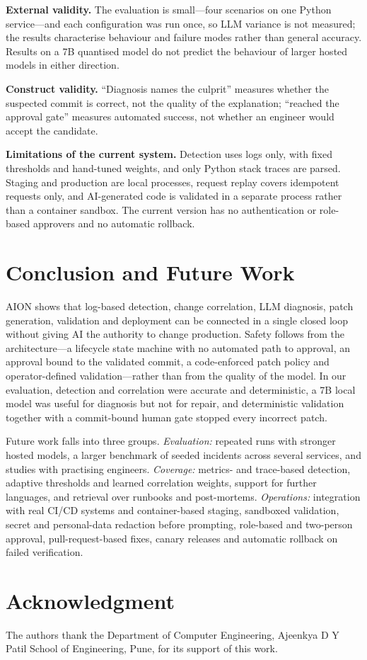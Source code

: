 \documentclass[conference]{IEEEtran}
\begin{document}
\textbf{External validity.} The evaluation is small---four scenarios on one Python service---and each configuration was run once, so LLM variance is not measured; the results characterise behaviour and failure modes rather than general accuracy. Results on a 7B quantised model do not predict the behaviour of larger hosted models in either direction.

\textbf{Construct validity.} ``Diagnosis names the culprit'' measures whether the suspected commit is correct, not the quality of the explanation; ``reached the approval gate'' measures automated success, not whether an engineer would accept the candidate.

\textbf{Limitations of the current system.} Detection uses logs only, with fixed thresholds and hand-tuned weights, and only Python stack traces are parsed. Staging and production are local processes, request replay covers idempotent requests only, and AI-generated code is validated in a separate process rather than a container sandbox. The current version has no authentication or role-based approvers and no automatic rollback.

\section{Conclusion and Future Work}
\label{sec:concl}
AION shows that log-based detection, change correlation, LLM diagnosis, patch generation, validation and deployment can be connected in a single closed loop without giving AI the authority to change production. Safety follows from the architecture---a lifecycle state machine with no automated path to approval, an approval bound to the validated commit, a code-enforced patch policy and operator-defined validation---rather than from the quality of the model. In our evaluation, detection and correlation were accurate and deterministic, a 7B local model was useful for diagnosis but not for repair, and deterministic validation together with a commit-bound human gate stopped every incorrect patch.

Future work falls into three groups. \emph{Evaluation:} repeated runs with stronger hosted models, a larger benchmark of seeded incidents across several services, and studies with practising engineers. \emph{Coverage:} metrics- and trace-based detection, adaptive thresholds and learned correlation weights, support for further languages, and retrieval over runbooks and post-mortems. \emph{Operations:} integration with real CI/CD systems and container-based staging, sandboxed validation, secret and personal-data redaction before prompting, role-based and two-person approval, pull-request-based fixes, canary releases and automatic rollback on failed verification.

\section*{Acknowledgment}
The authors thank the Department of Computer Engineering, Ajeenkya D Y Patil School of Engineering, Pune, for its support of this work.



\end{document}

